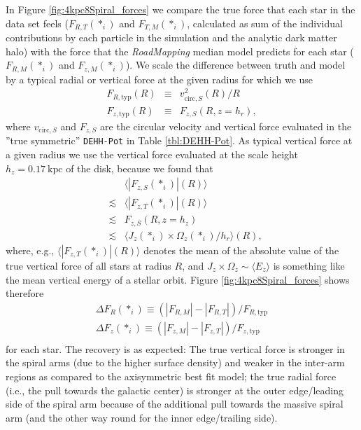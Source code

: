 \documentclass[iop,revtex4,numberedappendix,appendixfloats]{emulateapj}
\newcommand{\RM}{{\sl RoadMapping}}
\begin{document}
In Figure \ref{fig:4kpc8Spiral_forces} we compare the true force that each star in the data set feels ($F_{R,T}(*_i)$ and $F_{T,M}(*_i)$, calculated as sum of the individual contributions by each particle in the simulation and the analytic dark matter halo) with the force that the \RM{} median model predicts for each star ($F_{R,M}(*_i)$ and $F_{z,M}(*_i)$). We scale the difference between truth and model by a typical radial or vertical force at the given radius for which we use
\begin{eqnarray}
F_{R,\text{typ}}(R) &\equiv& v^2_{\text{circ},S}(R) / R\\
F_{z,\text{typ}}(R) &\equiv& F_{z,S}(R,z=h_r),
\end{eqnarray}
where $v_{\text{circ},S}$ and $F_{z,S}$ are the circular velocity and vertical force evaluated in the ''true symmetric'' \texttt{DEHH-Pot} in Table \ref{tbl:DEHH-Pot}. As typical vertical force at a given radius we use the vertical force evaluated at the scale height $h_z=0.17~\text{kpc}$ of the disk, because we found that 
\begin{eqnarray*} 
&&\langle |F_{z,S} (*_i)| (R) \rangle \\
&\lesssim& \langle |F_{z,T}(*_i)|  (R) \rangle\\
&\lesssim& F_{z,S}(R,z=h_z) \\
&\lesssim& \langle J_z(*_i) \times \Omega_z(*_i) / h_r \rangle (R),
\end{eqnarray*}
where, e.g., $\langle |F_{z,T}(*_i)|  (R) \rangle$ denotes the mean of the absolute value of the true vertical force of all stars at radius $R$, and $J_z \times \Omega_z \sim \langle E_z \rangle$ is something like the mean vertical energy of a stellar orbit. Figure \ref{fig:4kpc8Spiral_forces} shows therefore
\begin{eqnarray*}
\Delta F_R(*_i) \equiv \left(|F_{R,M}| - |F_{R,T}| \right) / F_{R,\text{typ}}\\
\Delta F_z(*_i) \equiv \left(|F_{z,M}| - |F_{z,T}| \right) / F_{z,\text{typ}}\\
\end{eqnarray*}
for each star. The recovery is as expected: The true vertical force is stronger in the spiral arms (due to the higher surface density) and weaker in the inter-arm regions as compared to the axisymmetric best fit model; the true radial force (i.e., the pull towards the galactic center) is stronger at the outer edge/leading side of the spiral arm because of the additional pull towards the massive spiral arm (and the other way round for the inner edge/trailing side).
\end{document}

